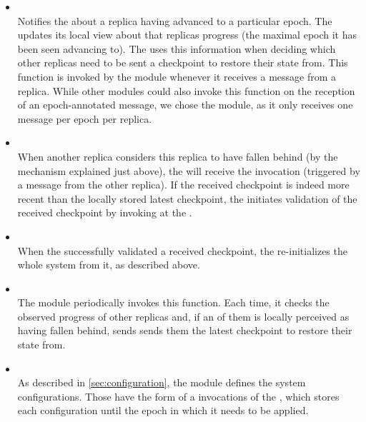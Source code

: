 \documentclass{article}
\begin{document}
\begin{itemize}
    \item {}\\
    Notifies the  about a replica having advanced to a particular epoch.
    The  updates its local view about that replicas progress
    (the maximal epoch it has been seen advancing to).
    The  uses this information when deciding which other replicas need to be sent a checkpoint
    to restore their state from.
    This function is invoked by the  module whenever it receives a message from a replica.
    While other modules could also invoke this function on the reception of an epoch-annotated message,
    we chose the  module, as it only receives one message per epoch per replica.

    \item {}\\
    When another replica considers this replica to have fallen behind (by the mechanism explained just above),
    the  will receive the  invocation
    (triggered by a message from the other replica).
    If the received checkpoint is indeed more recent than the locally stored latest checkpoint,
    the  initiates validation of the received checkpoint
    by invoking  at the .

    \item {}\\
    When the  successfully validated a received checkpoint,
    the  re-initializes the whole system from it, as described above.

    \item {}\\
    The  module periodically invokes this function.
    Each time, it checks the observed progress of other replicas and,
    if an of them is locally perceived as having fallen behind,
    sends sends them the latest checkpoint to restore their state from.

    \item {}\\
    As described in \cref{sec:configuration}, the  module defines the system configurations.
    Those have the form of a  invocations of the ,
    which stores each configuration until the epoch in which it needs to be applied.

\end{itemize}
\end{document}
